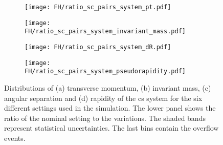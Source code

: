 \begin{figure}[H]
    \centering
    \begin{subfigure}{0.49\textwidth}
        \centering
        \texttt{[image: FH/ratio\_sc\_pairs\_system\_pt.pdf]}
        \caption{}
        \label{app:subfig:pt(sc)_FH}
    \end{subfigure}
    \begin{subfigure}{0.49\textwidth}
        \centering
        \texttt{[image: FH/ratio\_sc\_pairs\_system\_invariant\_mass.pdf]}
        \caption{}
        \label{app:subfig:m(sc)_FH}
    \end{subfigure}

    \vspace{0.2cm}
    
    \begin{subfigure}{0.49\textwidth}
        \centering
        \texttt{[image: FH/ratio\_sc\_pairs\_system\_dR.pdf]}
        \caption{}
        \label{app:subfig:dR(sc)_FH}
    \end{subfigure}
    \begin{subfigure}{0.49\textwidth}
        \centering
        \texttt{[image: FH/ratio\_sc\_pairs\_system\_pseudorapidity.pdf]}
        \caption{}
        \label{app:subfig:y(sc)_FH}
    \end{subfigure}
    \caption{Distributions of (a) transverse momentum, (b) invariant mass,  (c) angular separation and (d) rapidity of the cs system for the six different settings used in the simulation. The lower panel shows the ratio of the nominal setting to the variations. The shaded bands represent statistical uncertainties. The last bins contain the overflow events.}
    \label{app:fig:sc_FH}
\end{figure}

